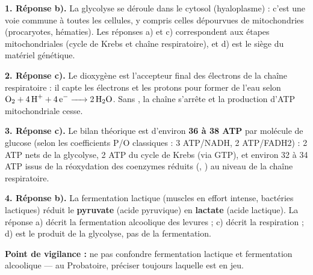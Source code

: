 \documentclass[11pt]{article}
\newcommand{\cle}[1]{{\popxbold\color{popdark}#1}}
\begin{document}
\begin{corrige}
\textbf{1. Réponse b).} La glycolyse se déroule dans le \cle{cytosol} (hyaloplasme) : c'est une voie commune à toutes les cellules, y compris celles dépourvues de mitochondries (procaryotes, hématies). Les réponses a) et c) correspondent aux étapes mitochondriales (cycle de Krebs et chaîne respiratoire), et d) est le siège du matériel génétique.

\textbf{2. Réponse c).} Le dioxygène  est l'\cle{accepteur final des électrons} de la chaîne respiratoire : il capte les électrons et les protons pour former de l'eau selon $\ce{O2 + 4 H+ + 4 e- -> 2 H2O}$. Sans , la chaîne s'arrête et la production d'ATP mitochondriale cesse.

\textbf{3. Réponse c).} Le bilan théorique est d'environ \textbf{36 à 38 ATP} par molécule de glucose (selon les coefficients P/O classiques : 3 ATP/NADH, 2 ATP/FADH2) : 2 ATP nets de la glycolyse, 2 ATP du cycle de Krebs (via GTP), et environ 32 à 34 ATP issus de la réoxydation des coenzymes réduits (, ) au niveau de la chaîne respiratoire.

\textbf{4. Réponse b).} La \cle{fermentation lactique} (muscles en effort intense, bactéries lactiques) réduit le \textbf{pyruvate} (acide pyruvique) en \textbf{lactate} (acide lactique). La réponse a) décrit la fermentation alcoolique des levures ; c) décrit la respiration ; d) est le produit de la glycolyse, pas de la fermentation.

\textbf{Point de vigilance :} ne pas confondre fermentation lactique et fermentation alcoolique — au Probatoire, préciser toujours laquelle est en jeu.
\end{corrige}
\end{document}

